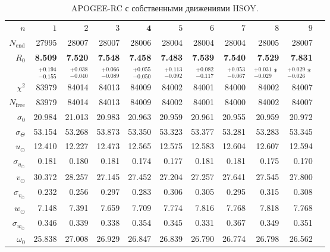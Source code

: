 \documentclass{matmex-diploma-custom}
\begin{document}
\pagebreak
\begin{table}[h!!] \label{table_hsoy_sigma0}
\centering
\caption{APOGEE-RC с собственными движениями HSOY.}
\begin{tabular}{r|rr|r|r|r|rrrrr}
\hline
$n$ & $1$ & $2$ & $3$ & $\textbf{4}$ & $5$&$ 6 $&$ 7 $&$ 8 $&$ 9 $\\
 $N_{\mathrm{end}}$ & 27995       &    28007 &   28007 &   28006 &   28004 &   28004 &    28004 &   28005 &   28007 \\
 $R_0 $& \textbf{8.509}       &     \textbf{7.520} &   \textbf{7.548} &   \textbf{7.458} &   \textbf{7.483} &   \textbf{7.539} &     \textbf{7.540} &   \textbf{7.529} &   \textbf{7.831} \\
       & $_{-0.155}^{+0.194} $ & $_{-0.040}^{+0.038}$ & $_{-0.089}^{+0.066}$   & $_{-0.050}^{+0.055}$  & $_{-0.092}^{+0.113}$  & $_{-0.117}^{+0.082}$  & $_{-0.067}^{+0.053}$  & $_{-0.029}^{+0.031} *$  & $_{-0.026}^{+0.029} *$  \\\hline
 $\chi^2 $& 83979   &  84014 &   84013 &   84009 &   84002 &   84001 &  84000 &   84002 &   84007 \\
 $N_{\mathrm{free}} $& 83979   &  84014 &   84013 &   84009 &   84002 &   84001 &  84000 &   84002 &   84007 \\
 $\sigma_0 $& 20.984      &  21.013 &  20.983 &  20.963 &  20.959 &  20.961 &  20.955 &  20.959 &  20.972  \\ 
 $\sigma_{\Theta} $& 53.154      &  53.268 &  53.873 &  53.350 &  53.323 &  53.377 &  53.281 &  53.283 &  53.345  \\\hline 
 $ u_{\odot} $& 12.410      &   12.227 &  12.473 &  12.565 &  12.575 &  12.583 &   12.604 &  12.607 &  12.594 \\
 $\sigma_{u_{\odot}} $&0.181       &     0.180 &   0.181 &   0.174 &   0.177 &   0.181 &    0.181 &   0.175 &    0.170 \\
 $v_{\odot} $& 30.372      &   28.257 &  27.145 &  27.452 &  27.204 &  27.257 &   27.641 &  27.545 &    27.800 \\
 $\sigma_{v_{\odot}}$&0.232       &    0.256 &   0.297 &   0.283 &   0.306 &   0.305 &    0.295 &   0.315 &   0.308 \\
 $w_{\odot} $& 7.148       &    7.391 &   7.659 &   7.709 &   7.774 &   7.816 &    7.768 &   7.818 &   7.768 \\
 $\sigma_{w_{\odot}}$&0.346       &    0.339 &   0.338 &   0.354 &   0.345 &   0.331 &    0.367 &   0.349 &   0.351 \\
 $\omega_0 $&25.838      &   27.008 &  26.929 &  26.847 &  26.839 &   26.790 &   26.774 &  26.798 &  26.562 \\

\end{tabular}
\end{table}
\end{document}
